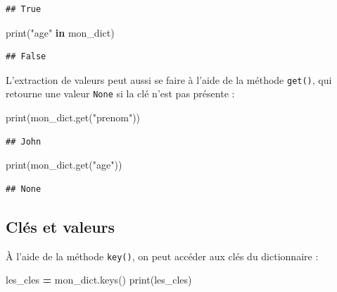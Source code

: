 \documentclass[
  12pt,
]{book}
\newenvironment{Shaded}{\begin{snugshade}}{\end{snugshade}}
\newcommand{\BuiltInTok}[1]{#1}
\newcommand{\KeywordTok}[1]{\textcolor[rgb]{0.13,0.29,0.53}{\textbf{#1}}}
\newcommand{\NormalTok}[1]{#1}
\newcommand{\OperatorTok}[1]{\textcolor[rgb]{0.81,0.36,0.00}{\textbf{#1}}}
\newcommand{\StringTok}[1]{\textcolor[rgb]{0.31,0.60,0.02}{#1}}
\numberwithin{equation}{section}
\numberwithin{countremarque}{section}
\begin{document}
\begin{lstlisting}
## True
\end{lstlisting}

\begin{Shaded}
\begin{Highlighting}[]
\BuiltInTok{print}\NormalTok{(}\StringTok{"age"} \KeywordTok{in}\NormalTok{ mon\_dict)}
\end{Highlighting}
\end{Shaded}

\begin{lstlisting}
## False
\end{lstlisting}

L'extraction de valeurs peut aussi se faire à l'aide de la méthode \texttt{get()}, qui retourne une valeur \texttt{None} si la clé n'est pas présente :

\begin{Shaded}
\begin{Highlighting}[]
\BuiltInTok{print}\NormalTok{(mon\_dict.get(}\StringTok{"prenom"}\NormalTok{))}
\end{Highlighting}
\end{Shaded}

\begin{lstlisting}
## John
\end{lstlisting}

\begin{Shaded}
\begin{Highlighting}[]
\BuiltInTok{print}\NormalTok{(mon\_dict.get(}\StringTok{"age"}\NormalTok{))}
\end{Highlighting}
\end{Shaded}

\begin{lstlisting}
## None
\end{lstlisting}

\subsection{Clés et valeurs}\label{cluxe9s-et-valeurs}

À l'aide de la méthode \texttt{key()}, on peut accéder aux clés du dictionnaire :

\begin{Shaded}
\begin{Highlighting}[]
\NormalTok{les\_cles }\OperatorTok{=}\NormalTok{ mon\_dict.keys()}
\BuiltInTok{print}\NormalTok{(les\_cles)}
\end{Highlighting}
\end{Shaded}
\end{document}

